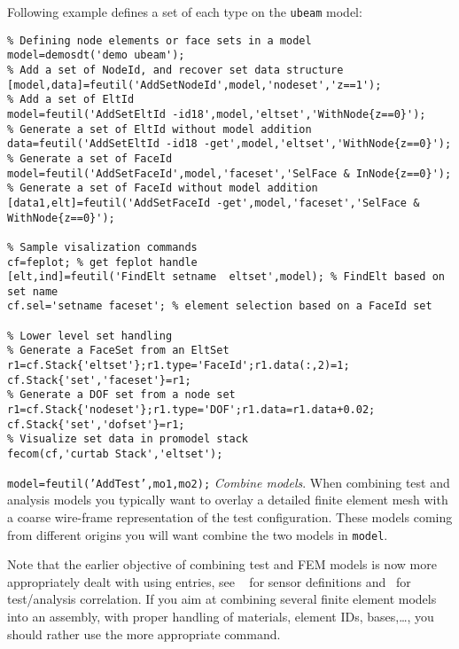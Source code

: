 Following example defines a set of each type on the {\tt ubeam} model:
\begin{verbatim}
% Defining node elements or face sets in a model
model=demosdt('demo ubeam'); 
% Add a set of NodeId, and recover set data structure
[model,data]=feutil('AddSetNodeId',model,'nodeset','z==1');
% Add a set of EltId 
model=feutil('AddSetEltId -id18',model,'eltset','WithNode{z==0}');
% Generate a set of EltId without model addition
data=feutil('AddSetEltId -id18 -get',model,'eltset','WithNode{z==0}');
% Generate a set of FaceId
model=feutil('AddSetFaceId',model,'faceset','SelFace & InNode{z==0}');
% Generate a set of FaceId without model addition
[data1,elt]=feutil('AddSetFaceId -get',model,'faceset','SelFace & WithNode{z==0}');

% Sample visalization commands
cf=feplot; % get feplot handle
[elt,ind]=feutil('FindElt setname  eltset',model); % FindElt based on set name
cf.sel='setname faceset'; % element selection based on a FaceId set

% Lower level set handling
% Generate a FaceSet from an EltSet
r1=cf.Stack{'eltset'};r1.type='FaceId';r1.data(:,2)=1;
cf.Stack{'set','faceset'}=r1;
% Generate a DOF set from a node set
r1=cf.Stack{'nodeset'};r1.type='DOF';r1.data=r1.data+0.02;
cf.Stack{'set','dofset'}=r1;
% Visualize set data in promodel stack
fecom(cf,'curtab Stack','eltset');
\end{verbatim}%



{\tt model=feutil('AddTest',mo1,mo2);} {\sl Combine models}. 
When combining test and analysis models you typically want to overlay a detailed finite element mesh with a coarse wire-frame representation of the test configuration. These models coming from different origins you will want combine the two models in {\tt model}.

\begin{SDT}
Note that the earlier objective of combining test and FEM models is now more appropriately dealt with using  entries, see ~ for sensor definitions and~ for test/analysis correlation.  If you aim at combining several finite element models into an assembly, with proper handling of materials, element IDs, bases,\dots, you should rather use the more appropriate  command.
\end{SDT}

